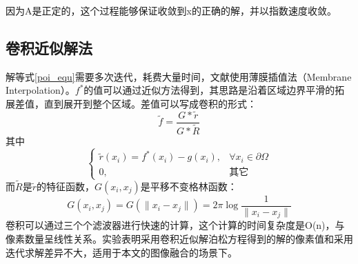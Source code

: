 因为A是正定的，这个过程能够保证收敛到x的正确的解，并以指数速度收敛。

\subsection{卷积近似解法}
解等式\eqref{poi_equ}需要多次迭代，耗费大量时间，文献\cite{Farbman:2011dc}使用薄膜插值法（Membrane Interpolation）。\(f^*\)的值可以通过近似方法得到，其思路是沿着区域边界平滑的拓展差值，直到展开到整个区域。差值可以写成卷积的形式：
\begin{equation}
\tilde{f} = \frac{G * \tilde{r}}{G * \tilde{R}}
\label{con_pyr}
\end{equation}
其中
\begin{equation}
\begin{cases} 
\tilde{r}(x_i) = f^*(x_i) - g(x_i), & \forall{x_i} \in \partial\Omega \\
0, & \mbox{其它}
\end{cases}
\label{con_pyr}
\end{equation}
而\(\tilde{R}\)是\(\tilde{r}\)的特征函数，\(G(x_i,x_j)\)是平移不变格林函数：
\begin{equation}
G(x_i,x_j) = G(\|x_i - x_j\|) = 2\pi\log{\frac{1}{\|x_i - x_j\|}}
\end{equation}
卷积可以通过三个个滤波器进行快速的计算，这个计算的时间复杂度是O(n)，与像素数量呈线性关系。实验表明采用卷积近似解泊松方程得到的解的像素值和采用迭代求解差异不大，适用于本文的图像融合的场景下。


\ifx\usechapbib\empty
\nocite{BSTcontrol}


\fi